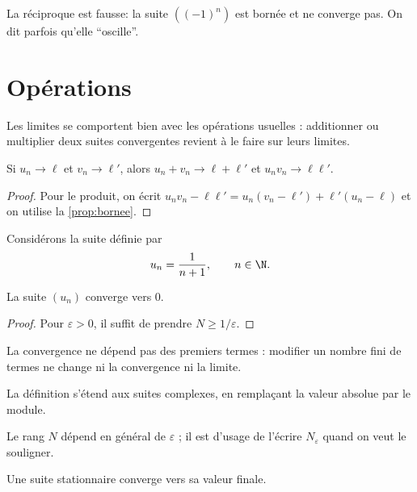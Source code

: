 La réciproque est fausse: la suite $((-1)^n)$ est bornée et ne converge
pas. On dit parfois qu'elle \enquote{oscille}.

\section{Opérations}%

Les limites se comportent bien avec les opérations usuelles : additionner ou
multiplier deux suites convergentes revient à le faire sur leurs limites.
\begin{theorem}[title=Opérations sur les limites]
    Si $u_n \to \ell$ et $v_n \to \ell'$, alors $u_n + v_n \to \ell + \ell'$
    et $u_n v_n \to \ell \ell'$.
\end{theorem}

\begin{proof}
    Pour le produit, on écrit
    $u_n v_n - \ell \ell' = u_n (v_n - \ell') + \ell' (u_n - \ell)$ et on
    utilise la \cref{prop:bornee}. \qedhere
\end{proof}

Considérons la suite définie par
\[
    u_n = \frac{1}{n + 1}, \qquad n \in \N.
\]
\begin{proposition}
    La suite $(u_n)$ converge vers $0$.
\end{proposition}

\begin{proof}
    Pour $\varepsilon > 0$, il suffit de prendre $N \ge 1/\varepsilon$. \qedhere
\end{proof}

\begin{remark}
    La convergence ne dépend pas des premiers termes : modifier un nombre
    fini de termes ne change ni la convergence ni la limite.
\end{remark}
\begin{remark}
    La définition s'étend aux suites complexes, en remplaçant la valeur
    absolue par le module.
\end{remark}
\begin{remark}
    Le rang $N$ dépend en général de $\varepsilon$ ; il est d'usage de
    l'écrire $N_\varepsilon$ quand on veut le souligner.
\end{remark}
\begin{remark}
    Une suite stationnaire converge vers sa valeur finale.
\end{remark}

